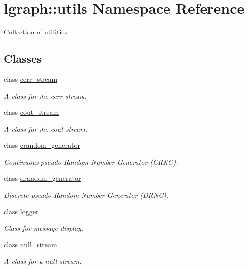 \hypertarget{namespacelgraph_1_1utils}{}\section{lgraph\+:\+:utils Namespace Reference}
\label{namespacelgraph_1_1utils}


Collection of utilities.  


\subsection*{Classes}
\begin{DoxyCompactItemize}
\item 
class \hyperlink{classlgraph_1_1utils_1_1cerr__stream}{cerr\+\_\+stream}
\begin{DoxyCompactList}\small\item\em A class for the cerr stream. \end{DoxyCompactList}\item 
class \hyperlink{classlgraph_1_1utils_1_1cout__stream}{cout\+\_\+stream}
\begin{DoxyCompactList}\small\item\em A class for the cout stream. \end{DoxyCompactList}\item 
class \hyperlink{classlgraph_1_1utils_1_1crandom__generator}{crandom\+\_\+generator}
\begin{DoxyCompactList}\small\item\em Continuous pseudo-\/\+Random Number Generator (C\+R\+NG). \end{DoxyCompactList}\item 
class \hyperlink{classlgraph_1_1utils_1_1drandom__generator}{drandom\+\_\+generator}
\begin{DoxyCompactList}\small\item\em Discrete pseudo-\/\+Random Number Generator (D\+R\+NG). \end{DoxyCompactList}\item 
class \hyperlink{classlgraph_1_1utils_1_1logger}{logger}
\begin{DoxyCompactList}\small\item\em Class for message display. \end{DoxyCompactList}\item 
class \hyperlink{classlgraph_1_1utils_1_1null__stream}{null\+\_\+stream}
\begin{DoxyCompactList}\small\item\em A class for a null stream. \end{DoxyCompactList}\item 

\end{DoxyCompactItemize}
